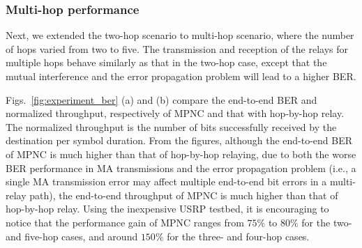 \subsubsection{Multi-hop performance}
Next, we extended the two-hop scenario to multi-hop scenario, where the number of hops varied from two to five. The transmission and reception of the relays for multiple hops behave similarly as that in the two-hop case, except that the mutual interference  and the error propagation problem will lead to a higher BER.

Figs.~\ref{fig:experiment_ber} (a) and (b) compare the end-to-end BER and normalized throughput, respectively of MPNC and that with hop-by-hop relay. 
The normalized throughput is the number of bits successfully received by the destination per symbol duration. 
From the figures, although the end-to-end BER of MPNC is much higher than that of hop-by-hop relaying, due to both the worse BER performance in MA transmissions and the error propagation problem (i.e., a single MA transmission error may affect multiple end-to-end bit errors in a multi-relay path),  the end-to-end throughput of MPNC is much higher
than that of hop-by-hop relay. Using the inexpensive USRP testbed, it is encouraging to notice that the performance gain of MPNC ranges from $75\%$ to $80\%$ for the two- and five-hop cases, and around $150\%$ for the three- and four-hop cases. 


